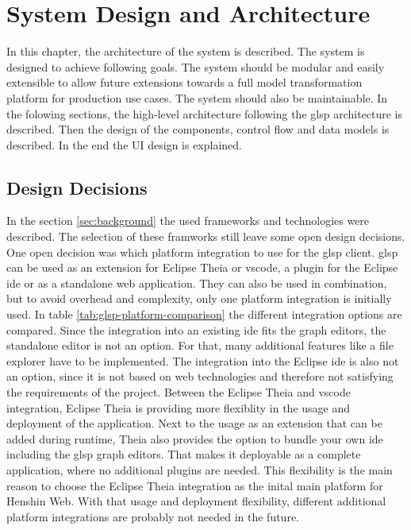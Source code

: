   \section{System Design and Architecture}
  \label{sec:system-design}

  In this chapter, the architecture of the system is described. The system is designed to achieve following goals. The system should be modular and easily extensible to allow future extensions towards a full model transformation platform for production use cases. The system should also be maintainable. In the folowing sections, the high-level architecture following the \ac{glsp} architecture is described. Then the design of the components, control flow and data models is described. In the end the UI design is explained.

  \subsection{Design Decisions}
  \label{subsec:design-decisions}

  In the section \ref{sec:background} the used frameworks and technologies were described. The selection of these framworks still leave some open design decisions. One open decision was which platform integration to use for the \ac{glsp} client. \ac{glsp} can be used as an extension for Eclipse Theia or \ac{vscode}, a plugin for the Eclipse \acs{ide} or as a standalone web application. They can also be used in combination, but to avoid overhead and complexity, only one platform integration is initially used. In table \ref{tab:glsp-platform-comparison} the different integration options are compared. Since the integration into an existing \acs{ide} fits the graph editors, the standalone editor is not an option. For that, many additional features like a file explorer have to be implemented. The integration into the Eclipse \acs{ide} is also not an option, since it is not based on web technologies and therefore not satisfying the requirements of the project. Between the Eclipse Theia and \ac{vscode} integration, Eclipse Theia is providing more flexiblity in the usage and deployment of the application. Next to the usage as an extension that can be added during runtime, Theia also provides the option to bundle your own \ac{ide} including the \ac{glsp} graph editors. That makes it deployable as a complete application, where no additional plugins are needed. This flexibility is the main reason to choose the Eclipse Theia integration as the inital main platform for Henshin Web. With that usage and deployment flexibility, different additional platform integrations are probably not needed in the future.

